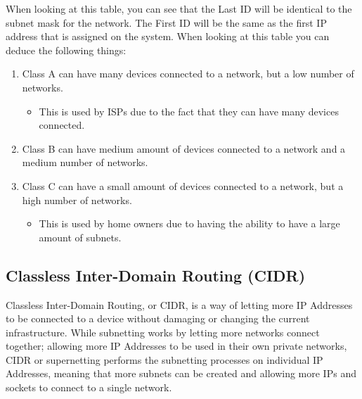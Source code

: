 \documentclass[a4paper,12pt]{article}
\begin{document}
    When looking at this table, you can see that the Last ID will be identical to the subnet mask for the network. The First ID will be the same as the first IP address that is assigned on the system. When looking at this table you can deduce the following things:
    \begin{enumerate}
	\item Class A can have many devices connected to a network, but a low number of networks.
	    \begin{itemize}
		\item This is used by ISPs due to the fact that they can have many devices connected.
	    \end{itemize}
	\item Class B can have medium amount of devices connected to a network and a medium number of networks.
	\item Class C can have a small amount of devices connected to a network, but a high number of networks.
	    \begin{itemize}
		\item This is used by home owners due to having the ability to have a large amount of subnets.
	    \end{itemize}
    \end{enumerate}

  \newpage

  \subsection{Classless Inter-Domain Routing (CIDR)}
    Classless Inter-Domain Routing, or CIDR, is a way of letting more IP Addresses to be connected to a device without damaging or changing the current infrastructure. While subnetting works by letting more networks connect together; allowing more IP Addresses to be used in their own private networks, CIDR or supernetting performs the subnetting processes on individual IP Addresses, meaning that more subnets can be created and allowing more IPs and sockets to connect to a single network.
\end{document}
